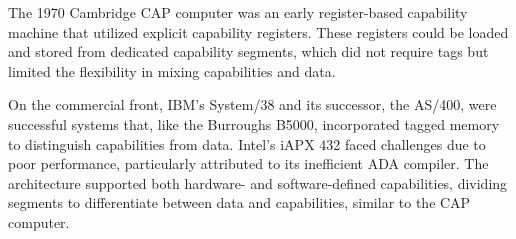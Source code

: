 



The 1970 Cambridge CAP computer was an early register-based capability machine that utilized explicit 
capability registers. These registers could be loaded and stored from dedicated capability 
segments, which did not require tags but limited the flexibility in mixing capabilities and data.

On the commercial front, IBM's System/38 and its successor, the AS/400, were successful 
systems that, like the Burroughs B5000, incorporated tagged memory to distinguish 
capabilities from data. Intel's iAPX 432 faced challenges due to poor performance, 
particularly attributed to its inefficient ADA compiler. The architecture supported 
both hardware- and software-defined capabilities, dividing segments to differentiate 
between data and capabilities, similar to the CAP computer.

